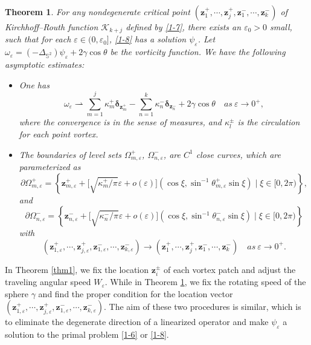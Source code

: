 \documentclass[12pt,reqno]{amsart}
\numberwithin{equation}{section}
\newtheorem{theorem}{Theorem}[section]
\theoremstyle{definition}
\theoremstyle{remark}
\newcommand{\ep}{\varepsilon}
\begin{document}
    \begin{theorem}\label{thm2}
    	For any nondegenerate critical point $(\boldsymbol z_1^+,\cdots,\boldsymbol z_j^+, \boldsymbol z_1^-,\cdots, \boldsymbol z_k^-)$  of Kirchhoff--Routh function $\mathcal K_{k+j}$ defined by \eqref{1-7}, there exists an $\varepsilon_0>0$ small, such that for each $\varepsilon\in (0,\varepsilon_0]$, \eqref{1-8} has a solution $\psi_\varepsilon$. Let $\omega_\varepsilon=(-\Delta_{\mathbb S^2})\psi_\varepsilon+2\gamma\cos\theta$ be the vorticity function. We have the following asymptotic estimates:
    	\begin{itemize}
    		\item[(i)] One has
    		$$\omega_\varepsilon\rightharpoonup \sum\limits_{m=1}^{j}\kappa_m^+\boldsymbol \delta_{\boldsymbol z_m^+}-\sum\limits_{n=1}^{k}\kappa_n^-\boldsymbol \delta_{\boldsymbol z_n^-}+2\gamma\cos\theta \quad as \ \varepsilon\to 0^+,$$
    		where the convergence is in the sense of measures, and $\kappa_l^\pm$ is the circulation for each point vortex.
    		\item[(ii)] The boundaries of level sets $\Omega_{m,\varepsilon}^+$, $\Omega_{n,\varepsilon}^-$, are $C^1$ close curves, which are parameterized as
    		$$\partial \Omega_{m,\varepsilon}^+=\left\{\boldsymbol z_{m,\varepsilon}^++\big[\sqrt{\kappa_m^+/\pi}\varepsilon+o(\varepsilon)\big](\cos\xi,\sin^{-1}\theta_{m,\ep}^+\sin\xi) \mid \xi\in[0, 2\pi) \right\},$$
    		and
    		$$\partial \Omega_{n,\varepsilon}^-=\left\{\boldsymbol z_{n,\varepsilon}^-+\big[\sqrt{\kappa_n^-/\pi}\varepsilon+o(\varepsilon)\big](\cos\xi,\sin^{-1}\theta_{n,\ep}^-\sin\xi) \mid \xi\in[0, 2\pi) \right\}$$
    		with
    		$$\left(\boldsymbol z_{1,\varepsilon}^+,\cdots,\boldsymbol z_{j,\varepsilon}^+, \boldsymbol z_{1,\varepsilon}^-,\cdots, \boldsymbol z_{k,\varepsilon}^-\right)\to \left(\boldsymbol z_1^+,\cdots,\boldsymbol z_j^+, \boldsymbol z_1^-,\cdots, \boldsymbol z_k^-\right)\quad as \ \varepsilon\to 0^+.$$
    	\end{itemize}
    \end{theorem}
    
   In Theorem \ref{thm1}, we fix the location $\boldsymbol z_i^\pm$ of each vortex patch and adjust the traveling angular speed 
   $W_\varepsilon$. While in Theorem \ref{thm2}, we fix the rotating speed of the sphere $\gamma$ and find the proper condition 
   for the location vector $(\boldsymbol z_{1,\varepsilon}^+,\cdots,\boldsymbol z_{j,\varepsilon}^+, \boldsymbol z_{1,\varepsilon}^-,\cdots, \boldsymbol z_{k,\varepsilon}^-)$.
   The aim of these two procedures is similar, which is to eliminate the degenerate direction of a linearized operator and make $\psi_\varepsilon$ a solution
   to the primal problem \eqref{1-6} or \eqref{1-8}.
    
\end{document}
